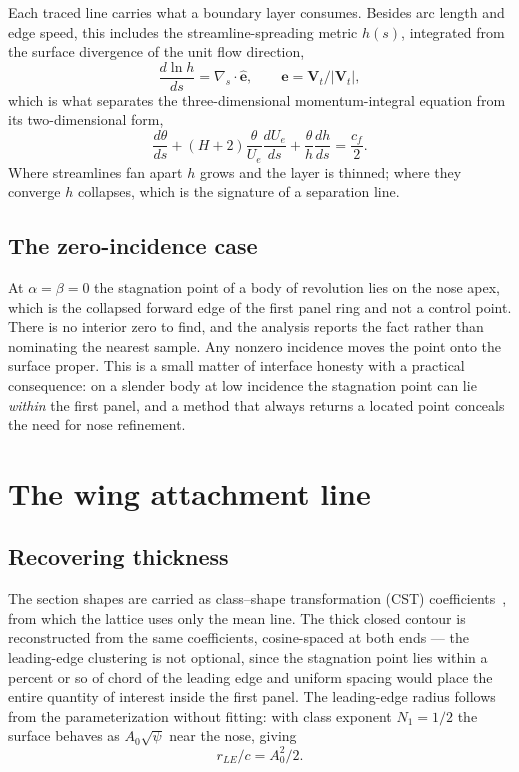 \documentclass[submit]{aiaa-tc}%
\begin{document}
Each traced line carries what a boundary layer consumes. Besides arc
length and edge speed, this includes the streamline-spreading metric
$h(s)$, integrated from the surface divergence of the unit flow direction,
%
\begin{equation}
  \frac{d \ln h}{d s} = \nabla_s \cdot \hat{\mathbf{e}}, \qquad
  \hat{\mathbf{e}} = \mathbf{V}_t / |\mathbf{V}_t| ,
\end{equation}
%
which is what separates the three-dimensional momentum-integral equation
from its two-dimensional form,
%
\begin{equation}
  \label{eq:momint}
  \frac{d\theta}{ds} + (H+2)\frac{\theta}{U_e}\frac{dU_e}{ds}
  + \frac{\theta}{h}\frac{dh}{ds} = \frac{c_f}{2} .
\end{equation}
%
Where streamlines fan apart $h$ grows and the layer is thinned; where they
converge $h$ collapses, which is the signature of a separation line.

\subsection{The zero-incidence case}

At $\alpha = \beta = 0$ the stagnation point of a body of revolution lies
on the nose apex, which is the collapsed forward edge of the first panel
ring and not a control point. There is no interior zero to find, and the
analysis reports the fact rather than nominating the nearest sample. Any
nonzero incidence moves the point onto the surface proper. This is a small
matter of interface honesty with a practical consequence: on a slender
body at low incidence the stagnation point can lie \emph{within} the first
panel, and a method that always returns a located point conceals the need
for nose refinement.

\section{The wing attachment line}
\label{sec:wing}

\subsection{Recovering thickness}

The section shapes are carried as class--shape transformation (CST)
coefficients~\cite{kulfan2007}, from which the lattice uses only the mean
line. The thick closed contour is reconstructed from the same
coefficients, cosine-spaced at both ends --- the leading-edge clustering
is not optional, since the stagnation point lies within a percent or so of
chord of the leading edge and uniform spacing would place the entire
quantity of interest inside the first panel. The leading-edge radius
follows from the parameterization without fitting: with class exponent
$N_1 = 1/2$ the surface behaves as $A_0\sqrt{\psi}$ near the nose, giving
%
\begin{equation}
  r_{LE}/c = A_0^2 / 2 .
\end{equation}
\end{document}
